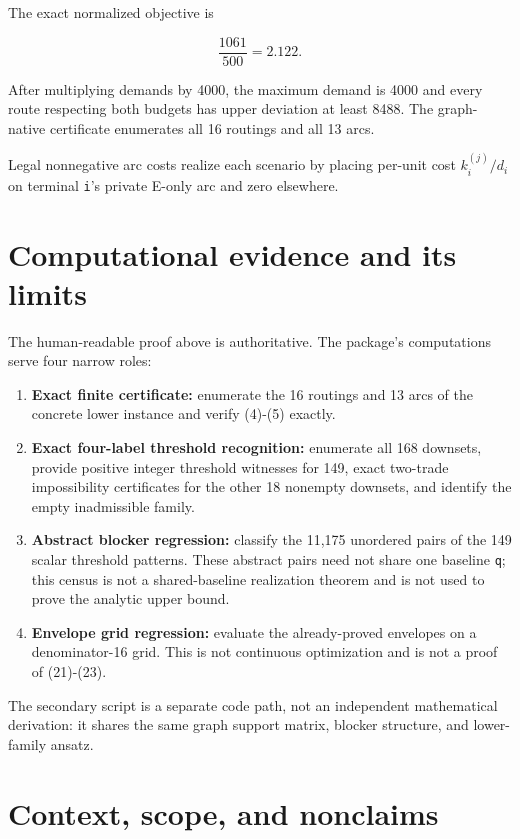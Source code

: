 \documentclass[
  11pt,
]{article}
\providecommand{\tightlist}{%
  \setlength{\itemsep}{0pt}\setlength{\parskip}{0pt}}
\begin{document}
The exact normalized objective is

\[
\frac{1061}{500}=2.122.
\]

After multiplying demands by 4000, the maximum demand is 4000 and every
route respecting both budgets has upper deviation at least 8488. The
graph-native certificate enumerates all 16 routings and all 13 arcs.

Legal nonnegative arc costs realize each scenario by placing per-unit
cost \(k_i^{(j)}/d_i\) on terminal \texttt{i}'s private E-only arc and
zero elsewhere.

\section{Computational evidence and its
limits}\label{computational-evidence-and-its-limits}

The human-readable proof above is authoritative. The package's computations serve
four narrow roles:

\begin{enumerate}
\def\labelenumi{\arabic{enumi}.}
\tightlist
\item
  \textbf{Exact finite certificate:} enumerate the 16 routings and 13
  arcs of the concrete lower instance and verify (4)-(5) exactly.
\item
  \textbf{Exact four-label threshold recognition:} enumerate all 168
  downsets, provide positive integer threshold witnesses for 149, exact
  two-trade impossibility certificates for the other 18 nonempty
  downsets, and identify the empty inadmissible family.
\item
  \textbf{Abstract blocker regression:} classify the 11,175 unordered
  pairs of the 149 scalar threshold patterns. These abstract pairs need
  not share one baseline \texttt{q}; this census is not a
  shared-baseline realization theorem and is not used to prove the
  analytic upper bound.
\item
  \textbf{Envelope grid regression:} evaluate the already-proved
  envelopes on a denominator-16 grid. This is not continuous
  optimization and is not a proof of (21)-(23).
\end{enumerate}

The secondary script is a separate code path, not an independent
mathematical derivation: it shares the same graph support matrix,
blocker structure, and lower-family ansatz.

\section{Context, scope, and
nonclaims}\label{context-scope-and-nonclaims}
\end{document}
